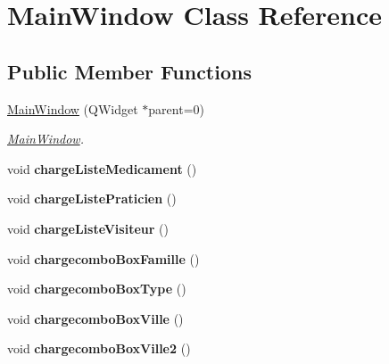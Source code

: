 \hypertarget{classMainWindow}{\section{Main\-Window Class Reference}
\label{classMainWindow}
}
\subsection*{Public Member Functions}
\begin{DoxyCompactItemize}
\item 
\hyperlink{classMainWindow_a8b244be8b7b7db1b08de2a2acb9409db}{Main\-Window} (Q\-Widget $\ast$parent=0)
\begin{DoxyCompactList}\small\item\em \hyperlink{classMainWindow}{Main\-Window}. \end{DoxyCompactList}\item 
\hypertarget{classMainWindow_a16abc3228e59b5eb189421c08aaac840}{void {\bfseries charge\-Liste\-Medicament} ()}\label{classMainWindow_a16abc3228e59b5eb189421c08aaac840}

\item 
\hypertarget{classMainWindow_a6e9e81db288f845d027aa24926b837aa}{void {\bfseries charge\-Liste\-Praticien} ()}\label{classMainWindow_a6e9e81db288f845d027aa24926b837aa}

\item 
\hypertarget{classMainWindow_aad1e0adee1331df491dff072ce98e663}{void {\bfseries charge\-Liste\-Visiteur} ()}\label{classMainWindow_aad1e0adee1331df491dff072ce98e663}

\item 
\hypertarget{classMainWindow_a24fff6171cd4ade3fedfe3c04e96c8a6}{void {\bfseries chargecombo\-Box\-Famille} ()}\label{classMainWindow_a24fff6171cd4ade3fedfe3c04e96c8a6}

\item 
\hypertarget{classMainWindow_a674ca789f95e94ffaa77db7c9c1ecfe2}{void {\bfseries chargecombo\-Box\-Type} ()}\label{classMainWindow_a674ca789f95e94ffaa77db7c9c1ecfe2}

\item 
\hypertarget{classMainWindow_afedcf0d4d76c575285242f16568b8ca0}{void {\bfseries chargecombo\-Box\-Ville} ()}\label{classMainWindow_afedcf0d4d76c575285242f16568b8ca0}

\item 
\hypertarget{classMainWindow_a88d8712b73cab139199a9fafa9b68279}{void {\bfseries chargecombo\-Box\-Ville2} ()}\label{classMainWindow_a88d8712b73cab139199a9fafa9b68279}

\end{DoxyCompactItemize}
